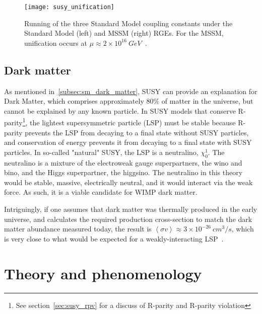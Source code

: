 \begin{figure}[!ht]
    \centering
\texttt{[image: susy\_unification]}
\caption{Running of the three Standard Model coupling constants under the Standard Model (left) and MSSM (right) RGEs.
For the MSSM, unification occurs at $\mu\approx 2\times 10^{16}~GeV$~\cite{susy-pheno-2000}.}
\label{fig:susy_unification}
\end{figure}

\subsection{Dark matter}\label{subsec:susy_dark_matter}

As mentioned in~\ref{subsec:sm_dark_matter}, SUSY can provide an explanation for Dark Matter, which comprises approximately $80\%$ of matter in the universe, but cannot be explained by any known particle.
In SUSY models that conserve R-parity\footnote{See section~\ref{sec:susy_rpv} for a discuss of R-parity and R-parity violation}, the lightest supersymmetric particle (LSP) must be stable because R-parity prevents the LSP from decaying to a final state without SUSY particles, and conservation of energy prevents it from decaying to a final state with SUSY particles.
In so-called "natural" SUSY, the LSP is a neutralino, $\chi_0^{1}$.
The neutralino is a mixture of the electroweak gauge superpartners, the wino and bino, and the Higgs superpartner, the higgsino.
The neutralino in this theory would be stable, massive, electrically neutral, and it would interact via the weak force.
As such, it is a viable candidate for WIMP dark matter.

Intriguingly, if one assumes that dark matter was thermally produced in the early universe, and calculates the required production cross-section to match the dark matter abundance measured today, the result is $\left<\sigma v\right> \approx 3 \times 10^{-26}~cm^{3}/s$, which is very close to what would be expected for a weakly-interacting LSP~\cite{susy-dark-matter-1996}.

\section{Theory and phenomenology}\label{sec:susy_theory}

